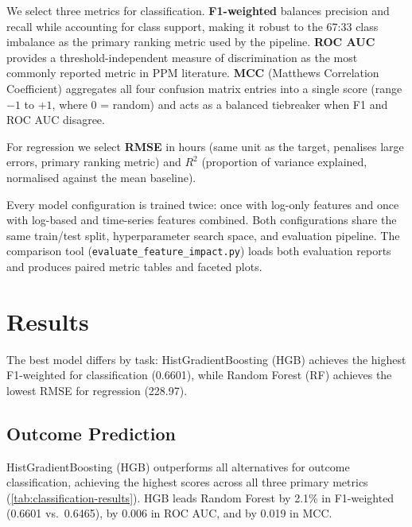 \documentclass[runningheads]{llncs}
\begin{document}
We select three metrics for classification. \textbf{F1-weighted} balances
precision and recall while accounting for class support, making it robust to
the 67:33 class imbalance as the primary ranking metric used by the
pipeline. \textbf{ROC AUC} provides a threshold-independent measure of
discrimination as the most commonly reported metric in PPM literature.
\textbf{MCC} (Matthews Correlation Coefficient) aggregates all four confusion
matrix entries into a single score (range $-1$ to $+1$, where 0 = random) and
acts as a balanced tiebreaker when F1 and ROC AUC disagree.

For regression we select \textbf{RMSE} in hours (same unit as the target,
penalises large errors, primary ranking metric) and \textbf{$R^2$}
(proportion of variance explained, normalised against the mean baseline).

Every
model configuration is trained twice: once with log-only features and once
with log-based and time-series features combined. Both configurations share
the same train/test split, hyperparameter search space, and evaluation
pipeline. The comparison tool (\texttt{evaluate\_feature\_impact.py}) loads
both evaluation reports and produces paired metric tables and faceted plots.

\section{Results}
\label{sec:results}

The best model differs by task: HistGradientBoosting (HGB) achieves the
highest F1-weighted for classification (0.6601), while Random Forest (RF)
achieves the lowest RMSE for regression (228.97).

\subsection{Outcome Prediction}
\label{sec:results-outcome}

HistGradientBoosting (HGB) outperforms all alternatives for outcome
classification, achieving the highest scores across all three primary
metrics (\autoref{tab:classification-results}). HGB leads Random Forest
by 2.1\% in F1-weighted (0.6601 vs.\ 0.6465), by 0.006 in ROC AUC, and
by 0.019 in MCC.
\end{document}

